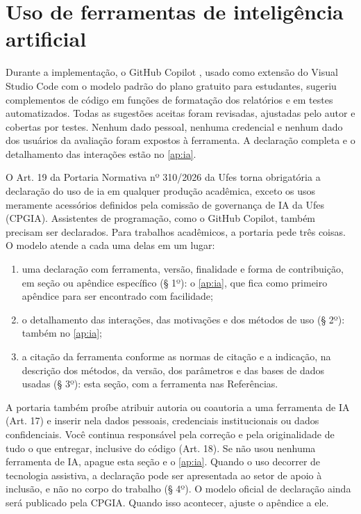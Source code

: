 \section{Uso de ferramentas de inteligência artificial}
\label{sec:implementacao:ia}

Durante a implementação, o GitHub Copilot \cite{github2026copilot}, usado
como extensão do Visual Studio Code com o modelo padrão do plano gratuito para
estudantes, sugeriu complementos de código em funções de formatação dos
relatórios e em testes automatizados. Todas as sugestões aceitas foram
revisadas, ajustadas pelo autor e cobertas por testes. Nenhum dado pessoal,
nenhuma credencial e nenhum dado dos usuários da avaliação foram expostos à
ferramenta. A declaração completa e o detalhamento das interações estão no
\cref{ap:ia}.

\begin{instrucao}
O Art. 19 da Portaria Normativa nº 310/2026 da Ufes \cite{ufes2026portaria}
torna obrigatória a declaração do uso de \ac{ia} em qualquer produção
acadêmica, exceto os usos meramente acessórios definidos pela comissão de
governança de IA da Ufes (CPGIA). Assistentes de programação, como o GitHub
Copilot, também precisam ser declarados. Para trabalhos acadêmicos, a portaria
pede três coisas. O modelo atende a cada uma delas em um lugar:
\begin{enumerate}
  \item uma declaração com ferramenta, versão, finalidade e forma de
        contribuição, em seção ou apêndice específico (§ 1º): o
        \cref{ap:ia}, que fica como primeiro apêndice para ser encontrado com
        facilidade;
  \item o detalhamento das interações, das motivações e dos métodos de uso
        (§ 2º): também no \cref{ap:ia};
  \item a citação da ferramenta conforme as normas de citação e a indicação,
        na descrição dos métodos, da versão, dos parâmetros e das bases de
        dados usadas (§ 3º): esta seção, com a ferramenta nas Referências.
\end{enumerate}
A portaria também proíbe atribuir autoria ou coautoria a uma ferramenta de IA
(Art. 17) e inserir nela dados pessoais, credenciais institucionais ou dados
confidenciais. Você continua responsável pela correção e pela originalidade
de tudo o que entregar, inclusive do código (Art. 18). Se não usou nenhuma
ferramenta de IA, apague esta seção e o \cref{ap:ia}. Quando o uso decorrer de
tecnologia assistiva, a declaração pode ser apresentada ao setor de apoio à
inclusão, e não no corpo do trabalho (§ 4º). O modelo oficial de declaração
ainda será publicado pela CPGIA. Quando isso acontecer, ajuste o apêndice a
ele.
\end{instrucao}
